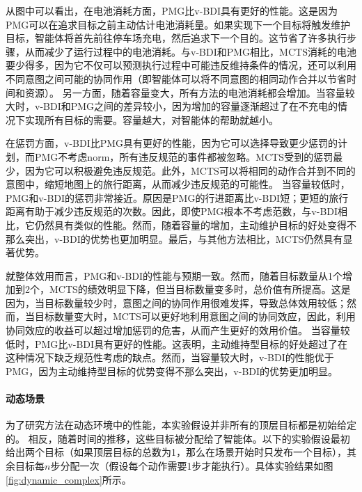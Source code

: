 从图中可以看出，在电池消耗方面，PMG比v-BDI具有更好的性能。这是因为PMG可以在追求目标之前主动估计电池消耗量。如果实现下一个目标将触发维护目标，智能体将首先前往停车场充电，然后追求下一个目的。这节省了许多执行步骤，从而减少了运行过程中的电池消耗。与v-BDI和PMG相比，MCTS消耗的电池要少得多，因为它不仅可以预测执行过程中可能违反维持条件的情况，还可以利用不同意图之间可能的协同作用（即智能体可以将不同意图的相同动作合并以节省时间和资源）。
另一方面，随着容量变大，所有方法的电池消耗都会增加。当容量较大时，v-BDI和PMG之间的差异较小，因为增加的容量逐渐超过了在不充电的情况下实现所有目标的需要。容量越大，对智能体的帮助就越小。

在惩罚方面，v-BDI比PMG具有更好的性能，因为它可以选择导致更少惩罚的计划，而PMG不考虑norm，所有违反规范的事件都被忽略。MCTS受到的惩罚最少，因为它可以积极避免违反规范。此外，MCTS可以将相同的动作合并到不同的意图中，缩短地图上的旅行距离，从而减少违反规范的可能性。
当容量较低时，PMG和v-BDI的惩罚非常接近。原因是PMG的行进距离比v-BDI短；更短的旅行距离有助于减少违反规范的次数。因此，即使PMG根本不考虑范数，与v-BDI相比，它仍然具有类似的性能。然而，随着容量的增加，主动维护目标的好处变得不那么突出，v-BDI的优势也更加明显。最后，与其他方法相比，MCTS仍然具有显著优势。

就整体效用而言，PMG和v-BDI的性能与预期一致。然而，随着目标数量从1个增加到2个，MCTS的绩效明显下降，但当目标数量变多时，总价值有所提高。这是因为，当目标数量较少时，意图之间的协同作用很难发挥，导致总体效用较低；然而，当目标数量变大时，MCTS可以更好地利用意图之间的协同效应，因此，利用协同效应的收益可以超过增加惩罚的危害，从而产生更好的效用价值。
当容量较低时，PMG比v-BDI具有更好的性能。这表明，主动维持型目标的好处超过了在这种情况下缺乏规范性考虑的缺点。然而，当容量较大时，v-BDI的性能优于PMG，因为主动维持型目标的优势变得不那么突出，v-BDI的优势更加明显。

\paragraph{动态场景}
为了研究方法在动态环境中的性能，本实验假设并非所有的顶层目标都是初始给定的。
相反，随着时间的推移，这些目标被分配给了智能体。以下的实验假设最初给出两个目标（如果顶层目标的总数为1，那么在场景开始时只发布一个目标），其余目标每$n$步分配一次（假设每个动作需要1步才能执行）。具体实验结果如图\ref{fig:dynamic_complex}所示。


